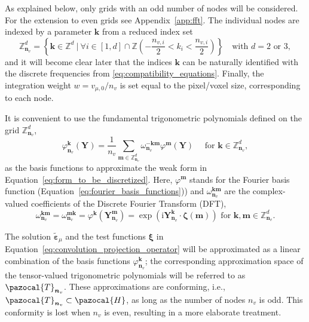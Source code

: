 As explained below, only grids with an odd number of nodes will be considered.
For the extension to even grids see Appendix~\ref{app:fft}.
The individual nodes are indexed by a parameter \(\bm k\) from a reduced index set
\begin{equation}
\mathbb{Z}_{\bm n_v}^{d}=\left\{\bm{ k} \in \mathbb{Z}^{d}\ |\ \forall i \in [1,d]\cap \mathbb Z \left(-\frac{n_{v,i}}{2}< k_{i}<\frac{n_{v,i}}{2}\right) \right\}\quad \text{with \(d=2\) or 3},
\end{equation}
and it will become clear later that the indices \(\bm  k\) can be naturally identified with the discrete frequencies from \eqref{eq:compatibility_equations}.
Finally, the integration weight \(w=v_{\mu,0} /n_v\) is set equal to the pixel/voxel size, corresponding to each node.

It is convenient to use the {fundamental trigonometric polynomials} defined on the grid \(\mathbb{Z}_{\bm n_v}^{d}\),
\begin{equation}\label{eq:fundamental_trigonometric_polynomials}
\varphi_{\bm n_v}^{\bm k}(\bm{Y})=\frac{1}{n_v} \sum_{\bm{ m} \in \mathbb{Z}_{\bm n_v}^{d}} \omega_{\bm n_v}^{-\bm{ k  m}} \varphi^{\bm  m}(\bm{ Y})\quad \text { for } \bm{ k} \in \mathbb{Z}_{\bm n_v}^{d},
\end{equation}
as the basis functions to approximate the weak form in Equation~\eqref{eq:form_to_be_discretized}.
Here, \(\varphi^{\bm  m}\) stands for the Fourier basis function (Equation~\eqref{eq:fourier_basis_functions})) and \(\omega_{\bm n_v}^{\bm  k \bm m}\) are the complex-valued coefficients of the Discrete Fourier Transform (DFT),
\begin{equation} \label{eq:def_dft_coefficients}
\omega_{\bm n_v}^{\bm  k \bm  m}=\omega_{\bm n_v}^{\bm  m\bm  k}=\varphi^{\bm  k}\left(\bm Y_{\bm n_v}^{\bm  m}\right)=\exp \left(\mathrm{i}\bm Y_{\bm n_v}^{\bm  k}\cdot \bm \zeta (\bm m)\right) \text { for } \bm{ k}, \bm{ m} \in \mathbb{Z}_{\bm n_v}^{d}.
\end{equation}

The solution \(\tilde{\bm\varepsilon}_\mu\) and the test functions \(\bm \xi\) in Equation~\eqref{eq:convolution_projection_operator} will be approximated as a linear combination of the basis functions \(\varphi_{\bm n_v}^{\bm  k}\); the corresponding approximation space of the tensor-valued trigonometric polynomials will be referred to as \(\pazocal{T}_{\bm n_v}\).
These approximations are conforming, i.e., \(\pazocal{T}_{\bm n_v} \subset \pazocal{H}\), as long as the number of nodes \(n_v\) is odd.
This conformity is lost when \(n_v\) is even, resulting in a more elaborate treatment.

